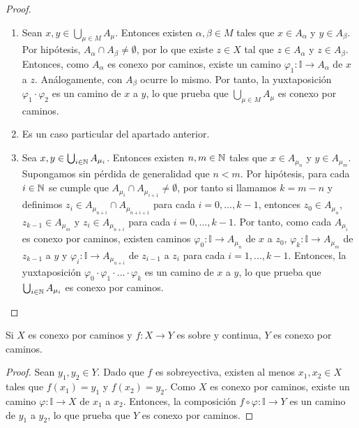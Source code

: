 \begin{proof}
    \begin{enumerate}
        \item Sean $x, y \in \bigcup_{\mu \in M} A_\mu$. Entonces existen $\alpha, \beta \in M$ tales que $x \in A_\alpha$ y $y \in A_\beta$. Por hipótesis, $A_\alpha \cap A_\beta \neq \emptyset$, por lo que existe $z \in X$ tal que $z \in A_\alpha$ y $z \in A_\beta$. Entonces, como $A_\alpha$ es conexo por caminos, existe un camino $\varphi_1 \colon \mathbb{I} \to A_\alpha$ de $x$ a $z$. Análogamente, con $A_\beta$ ocurre lo mismo. Por tanto, la yuxtaposición $\varphi_1 \cdot \varphi_2$ es un camino de $x$ a $y$, lo que prueba que $\bigcup_{\mu \in M} A_\mu$ es conexo por caminos.
        \item Es un caso particular del apartado anterior.
        \item Sea $x, y \in \bigcup_{i \in \mathbb{N}} A_{\mu_i}$. Entonces existen $n, m \in \mathbb{N}$ tales que $x \in A_{\mu_n}$ y $y \in A_{\mu_m}$. Supongamos sin pérdida de generalidad que $n < m$. Por hipótesis, para cada $i \in \mathbb{N}$ se cumple que $A_{\mu_i} \cap A_{\mu_{i+1}} \neq \emptyset$, por tanto si llamamos $k = m - n$ y definimos $z_i \in A_{\mu_{n+i}} \cap A_{\mu_{n+i+1}}$ para cada $i = 0, \dots, k - 1$, entonces $z_0 \in A_{\mu_n}$, $z_{k-1} \in A_{\mu_m}$ y $z_i \in A_{\mu_{n+i}}$ para cada $i = 0, \dots, k - 1$. Por tanto, como cada $A_{\mu_i}$ es conexo por caminos, existen caminos $\varphi_0 \colon \mathbb{I} \to A_{\mu_n}$ de $x$ a $z_0$, $\varphi_k \colon \mathbb{I} \to A_{\mu_m}$ de $z_{k-1}$ a $y$ y $\varphi_i \colon \mathbb{I} \to A_{\mu_{n+i}}$ de $z_{i-1}$ a $z_i$ para cada $i = 1, \dots, k - 1$. Entonces, la yuxtaposición $\varphi_0 \cdot \varphi_1 \cdot \dots \cdot \varphi_k$ es un camino de $x$ a $y$, lo que prueba que $\bigcup_{i \in \mathbb{N}} A_{\mu_i}$ es conexo por caminos.
    \end{enumerate}
\end{proof}
\begin{proposición}
    Si $X$ es conexo por caminos y $f \colon X \to Y$ es sobre y continua, $Y$ es conexo por caminos.
\end{proposición}
\begin{proof}
    Sean $y_1, y_2 \in Y$. Dado que $f$ es sobreyectiva, existen al menos $x_1, x_2 \in X$ tales que $f(x_1) = y_1$ y $f(x_2) = y_2$. Como $X$ es conexo por caminos, existe un camino $\varphi \colon \mathbb{I} \to X$ de $x_1$ a $x_2$. Entonces, la composición $f \circ \varphi \colon \mathbb{I} \to Y$ es un camino de $y_1$ a $y_2$, lo que prueba que $Y$ es conexo por caminos.
\end{proof}

